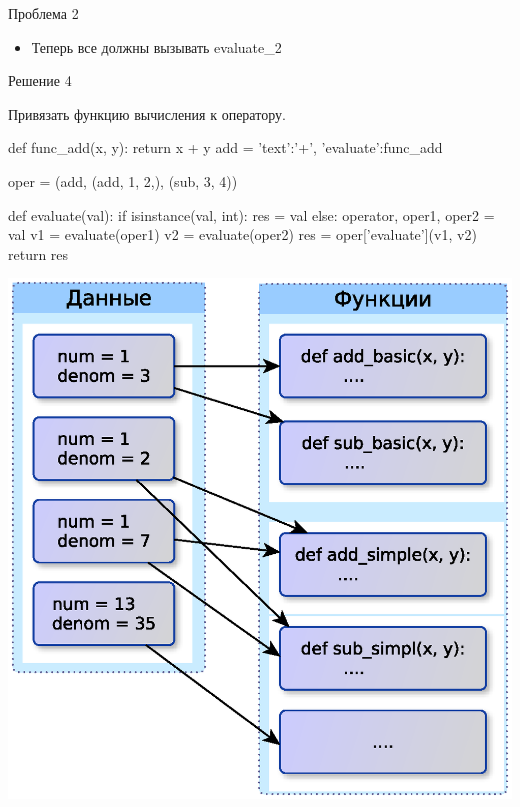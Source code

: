 \documentclass{article}
\begin{document}
\begin{center} Проблема 2 \end{center}
\begin{itemize}
    \item Теперь все должны вызывать evaluate_2
\end{itemize}
\newpage

\begin{center} Решение 4 \end{center}
    Привязать функцию вычисления к оператору.
\begin{itemize}
    def func_add(x, y):
        return x + y
    add = {'text':'+', 'evaluate':func_add}

    oper = (add, (add, 1, 2,), (sub, 3, 4))

    def evaluate(val):
        if isinstance(val, int):
            res = val
        else:
            operator, oper1, oper2 = val
            v1 = evaluate(oper1)
            v2 = evaluate(oper2)
            res = oper['evaluate'](v1, v2)
        return res

\end{itemize}
\newpage

\begin{center} \includegraphics{images/semi_OOP_style.eps} \end{center} 
\newpage
\end{document}
